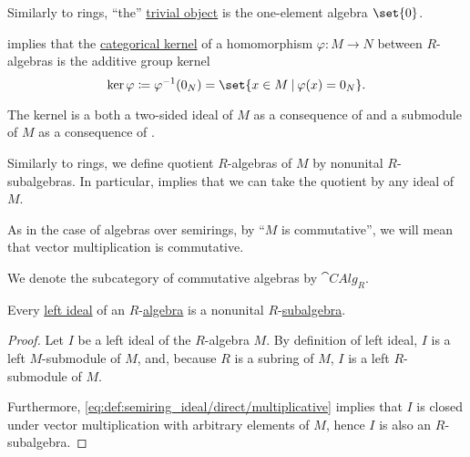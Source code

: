 \begin{definition}
\begin{thmenum}
     Similarly to rings, \enquote{the} \hyperref[def:trivial_object]{trivial object} is the one-element algebra \( \set{ 0 } \).

      implies that the \hyperref[def:zero_morphisms/kernel]{categorical kernel} of a homomorphism \( \varphi: M \to N \) between  \( R \)-algebras is the additive group kernel
    \begin{equation*}
      \ker \varphi \coloneqq \varphi^{-1}(0_N) = \set{ x \in M \given \varphi(x) = 0_N }.
    \end{equation*}

    The kernel is a both a two-sided ideal of \( M \) as a consequence of  and a submodule of \( M \) as a consequence of .

     Similarly to rings, we define quotient \( R \)-algebras of \( M \) by nonunital \( R \)-subalgebras. In particular,  implies that we can take the quotient by any ideal of \( M \).

     As in the case of algebras over semirings, by \enquote{\( M \) is commutative}, we will mean that vector multiplication is commutative.

    We denote the subcategory of commutative algebras by \( \cat{CAlg}_R \).
  \end{thmenum}
\end{definition}

\begin{proposition}\label{thm:algebra_ideal_is_subalgebra}
  Every \hyperref[def:semiring_ideal]{left ideal} of an \( R \)-\hyperref[def:algebra_over_ring]{algebra} is a nonunital \( R \)-\hyperref[def:algebra_over_ring/submodel]{subalgebra}.
\end{proposition}
\begin{proof}
  Let \( I \) be a left ideal of the \( R \)-algebra \( M \). By definition of left ideal, \( I \) is a left \( M \)-submodule of \( M \), and, because \( R \) is a subring of \( M \), \( I \) is a left \( R \)-submodule of \( M \).

  Furthermore, \eqref{eq:def:semiring_ideal/direct/multiplicative} implies that \( I \) is closed under vector multiplication with arbitrary elements of \( M \), hence \( I \) is also an \( R \)-subalgebra.
\end{proof}

